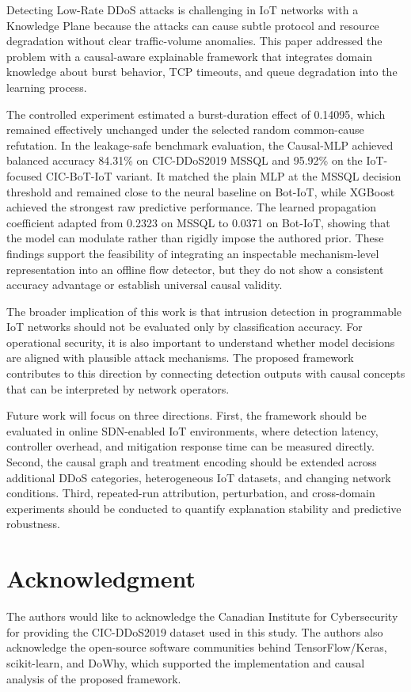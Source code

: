 \documentclass[journal]{IEEEtran}
\begin{document}
Detecting Low-Rate DDoS attacks is challenging in IoT networks with a Knowledge
Plane because the attacks can cause subtle protocol and resource degradation
without clear traffic-volume anomalies. This paper addressed the problem with
a causal-aware explainable framework that integrates domain knowledge about
burst behavior, TCP timeouts, and queue degradation into the learning process.

The controlled experiment estimated a burst-duration effect of 0.14095, which
remained effectively unchanged under the selected random common-cause
refutation. In the leakage-safe benchmark evaluation, the Causal-MLP achieved
balanced accuracy 84.31\% on CIC-DDoS2019 MSSQL and 95.92\% on the
IoT-focused CIC-BoT-IoT variant. It matched the plain MLP at the MSSQL
decision threshold and remained close to the neural baseline on Bot-IoT,
while XGBoost achieved the strongest raw predictive performance. The learned
propagation coefficient adapted from 0.2323 on MSSQL to 0.0371 on Bot-IoT,
showing that the model can modulate rather than rigidly impose the authored
prior. These findings support the feasibility of integrating an inspectable
mechanism-level representation into an offline flow detector, but they do not
show a consistent accuracy advantage or establish universal causal validity.

The broader implication of this work is that intrusion detection in programmable IoT networks should not be evaluated only by classification accuracy. For operational security, it is also important to understand whether model decisions are aligned with plausible attack mechanisms. The proposed framework contributes to this direction by connecting detection outputs with causal concepts that can be interpreted by network operators.

Future work will focus on three directions. First, the framework should be evaluated in online SDN-enabled IoT environments, where detection latency, controller overhead, and mitigation response time can be measured directly. Second, the causal graph and treatment encoding should be extended across additional DDoS categories, heterogeneous IoT datasets, and changing network conditions. Third, repeated-run attribution, perturbation, and cross-domain experiments should be conducted to quantify explanation stability and predictive robustness.

\section*{Acknowledgment}

The authors would like to acknowledge the Canadian Institute for Cybersecurity for providing the CIC-DDoS2019 dataset used in this study. The authors also acknowledge the open-source software communities behind TensorFlow/Keras, scikit-learn, and DoWhy, which supported the implementation and causal analysis of the proposed framework.
\begingroup
\sloppy


\endgroup

\end{document}
